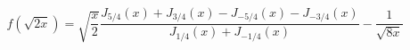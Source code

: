 \documentclass{article}
\begin{document}
$$f(\sqrt{2x})=\sqrt{\frac x2}\frac{J_{5/4}(x)+J_{3/4}(x)-J_{-5/4}(x)-J_{-3/4}(x)}{J_{1/4}(x)+J_{-1/4}(x)}-\frac 1{\sqrt{8x}}$$
\end{document}
